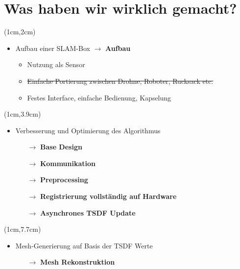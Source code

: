 \documentclass{beamer}
\begin{document}
\section{Was haben wir wirklich gemacht?}
\begin{frame}{\secname}
\begin{textblock*}{12cm}(1cm,2cm)
\begin{itemize}
\item{Aufbau einer SLAM-Box {\small\color{dark}$\rightarrow$ \textbf{Aufbau}}}
\begin{itemize}
\item{Nutzung als Sensor}
\item{\sout{Einfache Portierung zwischen Drohne, Roboter, Rucksack etc.}}
\item{Festes Interface, einfache Bedienung, Kapselung}
\end{itemize}
\end{itemize}
\end{textblock*}
\begin{textblock*}{12cm}(1cm,3.9cm)
\begin{itemize}
\item{Verbesserung und Optimierung des Algorithmus}
\begin{itemize}
\item[$\rightarrow$]{\color{dark} \textbf{Base Design}}
\item[$\rightarrow$]{\color{dark} \textbf{Kommunikation}}
\item[$\rightarrow$]{\color{dark} \textbf{Preprocessing}}
\item[$\rightarrow$]{\color{dark} \textbf{Registrierung vollständig auf Hardware}}
\item[$\rightarrow$]{\color{dark} \textbf{Asynchrones TSDF Update}}
\end{itemize}
\end{itemize}
\end{textblock*}
\begin{textblock*}{12cm}(1cm,7.7cm)
\begin{itemize}
\item{Mesh-Generierung auf Basis der TSDF Werte}
\begin{itemize}
\item[$\rightarrow$]{\color{dark} \textbf{Mesh Rekonstruktion}}
\end{itemize}
\end{itemize}
\end{textblock*}
\end{frame}
\end{document}
